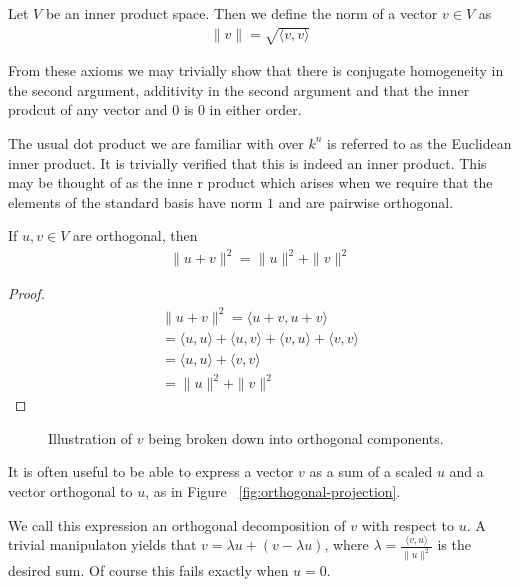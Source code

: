 \documentclass[]{article}
\begin{document}
\begin{defi} [Norm]
	Let $V$ be an inner product space. Then we define the norm of a vector $v \in V$ as
	\begin{align*}
			\|v\| =  \sqrt{\langle v, v \rangle }
	\end{align*}
\end{defi}

From these axioms we may trivially show that there is conjugate homogeneity in the second argument, additivity in the second argument and that the inner prodcut of any vector and $0$ is $0$ in either order.

The usual dot product we are familiar with over $k^n$ is referred to as the Euclidean inner product. It is trivially verified that this is indeed an inner product. This may be thought of as the inne r product which arises when we require that the elements of the standard basis have norm $1$ and are pairwise orthogonal.

\begin{thm} 
	If $u,v \in V$ are orthogonal, then 
	\begin{align*}
	\|u+v\|^2 = \|u\|^2 + \|v\|^2
	\end{align*}
\end{thm}

\begin{proof}
		\begin{align*}
				\|u+v\|^2 = \langle u+v, u+v \rangle \\
				= \langle u, u \rangle + \langle u, v \rangle + \langle v, u \rangle + \langle v, v \rangle \\
				= \langle u, u \rangle  + \langle v, v \rangle \\
				= \|u\|^2 + \|v\|^2
		\end{align*}
\end{proof}

\begin{figure}[ht]
\centering
{}
\caption{Illustration of $v$ being broken down into orthogonal components.}
\label{fig:orthogonal-decomposition}
\end{figure}

It is often useful to be able to express a vector $v$ as a sum of a scaled $u$ and a vector orthogonal to $u$, as in Figure ~\ref{fig:orthogonal-projection}. 

We call this expression an orthogonal decomposition of $v$ with respect to $u$. A trivial manipulaton yields that $v = \lambda u + (v - \lambda u)$, where $\lambda = \frac{\langle v, u \rangle }{\|u\|^2}$ is the desired sum. Of course this fails exactly when $u = 0$.
\end{document}
